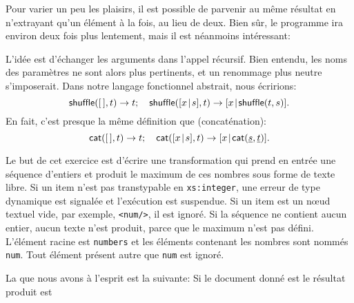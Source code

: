 Pour varier un peu les plaisirs, il est possible de parvenir au même
résultat en n'extrayant qu'un élément à la fois, au lieu de deux. Bien
sûr, le programme ira environ deux fois plus lentement, mais il est
néanmoins intéressant:
L'idée est d'échanger les arguments dans l'appel récursif. Bien
entendu, les noms des paramètres ne sont alors plus pertinents, et un
renommage plus neutre s'imposerait. Dans notre langage fonctionnel
abstrait, nous écririons:
\begin{equation*}
\textsf{shuffle}([\,],t) \rightarrow t;\quad
\textsf{shuffle}([{x}\!\mid\!{s}],t) \rightarrow [{x}\!\mid\!{\textsf{shuffle}(t,s)}].
\end{equation*}
En fait, c'est presque la même définition que  (concaténation):
\begin{equation*}
\textsf{cat}([\,],t) \rightarrow t;\quad
\textsf{cat}([{x}\!\mid\!{s}],t) \rightarrow [{x}\!\mid\!{\textsf{cat}(\underline{s},\underline{t})}].
\end{equation*}


Le but de cet exercice est d'écrire une transformation \XSLT qui prend
en entrée une séquence d'entiers et produit le maximum de ces nombres
sous forme de texte libre. Si un item n'est pas transtypable en
\texttt{xs:integer}, une erreur de type dynamique est signalée et
l'exécution est suspendue. Si un item est un nœud textuel vide,
par exemple, \texttt{<num/>}, il est ignoré. Si la séquence ne
contient aucun entier, aucun texte n'est produit, parce que le
maximum n'est pas défini. L'élément racine est \texttt{numbers} et les
éléments contenant les nombres sont nommés \texttt{num}. Tout élément
présent autre que \texttt{num} est ignoré.

La \DTD que nous avons à l'esprit est la suivante:
\noindent Si le document donné est
\noindent le résultat produit est

